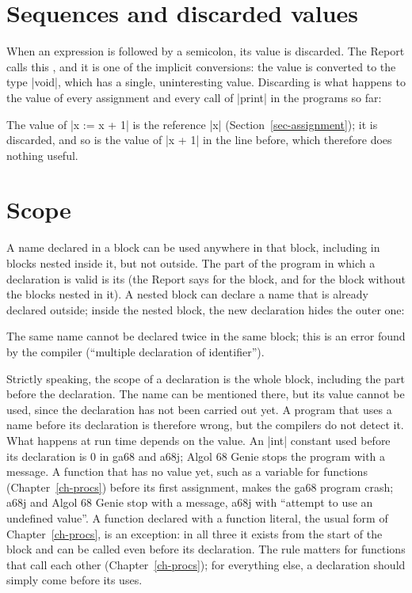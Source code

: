 \section{Sequences and discarded values}\label{sec-voiding}

When an expression is followed by a semicolon, its value is discarded. The
Report calls this , and it is one of the implicit conversions:
the value is converted to the type \code|void|, which has a single,
uninteresting value. Discarding is what happens to the value of every
assignment and every call of \code|print| in the programs so far:


The value of \code|x := x + 1| is the reference \code|x|
(Section~\ref{sec-assignment}); it is discarded, and so is the value of
\code|x + 1| in the line before, which therefore does nothing useful.

\section{Scope}\label{sec-scope}

A name declared in a block can be used anywhere in that block, including
in blocks nested inside it, but not outside. The part of the program in
which a declaration is valid is its  (the Report says
 for the block, and  for the block without the
blocks nested in it). A nested block can declare a
name that is already declared outside; inside the nested block, the new
declaration hides the outer one:


The same name cannot be declared twice in the same block; this is an
error found by the compiler (``multiple declaration of identifier'').

Strictly speaking, the scope of a declaration is the whole block,
including the part before the declaration. The name can be mentioned
there, but its value cannot be used, since the declaration has not been
carried out yet. A program that uses a name before its declaration is
therefore wrong, but the compilers do not detect it. What happens at run
time depends on the value. An \code|int| constant used before its
declaration is 0 in ga68 and a68j; Algol 68 Genie stops the program with
a message. A function that has no value yet, such as a variable for
functions (Chapter~\ref{ch-procs}) before its first assignment, makes the
ga68 program crash; a68j and Algol 68 Genie stop with a message, a68j with
``attempt to use an undefined value''. A function declared with a
function literal, the usual form of Chapter~\ref{ch-procs}, is an
exception: in all three it exists from the start of the block and can be
called even before its declaration. The rule matters for functions that
call each other (Chapter~\ref{ch-procs}); for everything else, a
declaration should simply come before its uses.

